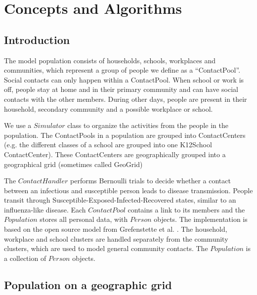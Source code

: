 \chapter{Concepts and Algorithms}
\label{chap:code}


\section{Introduction}
\label{section:ConceptsIntro}

The model population consists of households, schools, workplaces and
communities, which represent a group of people we define as a ``ContactPool''.
Social contacts can only happen within a ContactPool.
When school or work is off, people stay at home and in their primary
community and can have social contacts with the other members.
During other days, people are present in their household, secondary community
and a possible workplace or school.  



We use a $Simulator$ class to organize the activities from the people in the population.
The ContactPools in a population are grouped into ContactCenters (e.g. the different classes of a school are grouped into one K12School ContactCenter).
These ContactCenters are geographically grouped into a geographical grid (sometimes called GeoGrid)

The $Contact Handler$ performs Bernoulli trials to decide whether a contact
between an infectious and susceptible person leads to disease transmission. 
People transit through Susceptible-Exposed-Infected-Recovered states,
similar to an influenza-like disease.
Each $ContactPool$ contains a link to its members and the $Population$ stores all personal
data, with $Person$ objects.
The implementation is based on the open source model from Grefenstette et al. \cite{grefenstette2013}. 
The household, workplace and school clusters are handled separately from the
community clusters, which are used to model general community contacts. The
$Population$ is a collection of $Person$ objects.



\section{Population on a geographic grid}
\label{section:gengeopop}

